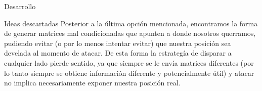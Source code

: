 \begin{section}{Desarrollo}
\begin{subsection}{Ideas descartadas}
		Posterior a la última opción mencionada, encontramos la forma de generar matrices mal condicionadas que apunten a donde nosotros querramos, pudiendo evitar (o por lo menos intentar evitar) que nuestra posición sea develada al momento de atacar. De esta forma la estrategía de disparar a cualquier lado pierde sentido, ya que siempre se le envía matrices diferentes (por lo tanto siempre se obtiene información diferente y potencialmente útil) y atacar no implica necesariamente exponer nuestra posición real.	\end{subsection}
\end{section}
